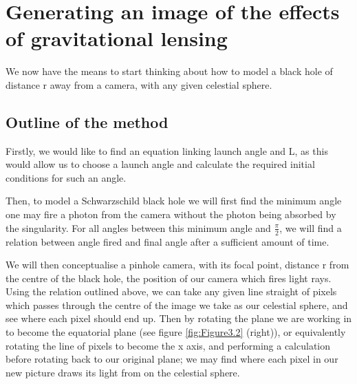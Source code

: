 \documentclass[oneside,openright,frontopenright, singlespacing]{dmathesis}
\begin{document}
\section{Generating an image of the effects of gravitational lensing}\label{sec:Section3.5}

	We now have the means to start thinking about how to model a black hole of distance r away from a camera, with any given celestial sphere.

\subsection{Outline of the method}\label{subsec:Subsection3.5.1}

	Firstly, we would like to find an equation linking launch angle and L, as this would allow us to choose a launch angle and calculate the required initial conditions for such an angle.

\vspace{1em}
	Then, to model a Schwarzschild black hole we will first find the minimum angle one may fire a photon from the camera without the photon being absorbed by the singularity. For all angles between this minimum angle and $\frac{\pi}{2}$, we will find a relation between angle fired and final angle after a sufficient amount of time.

\vspace{1em}
	We will then conceptualise a pinhole camera, with its focal point, distance r from the centre of the black hole, the position of our camera which fires light rays. Using the relation outlined above, we can take any given line straight of pixels which passes through the centre of the image we take as our celestial sphere, and see where each pixel should end up. Then by rotating the plane we are working in to become the equatorial plane (see figure \ref{fig:Figure3.2} (right)), or equivalently rotating the line of pixels to become the x axis, and performing a calculation before rotating back to our original plane; we may find where each pixel in our new picture draws its light from on the celestial sphere.
\end{document}
